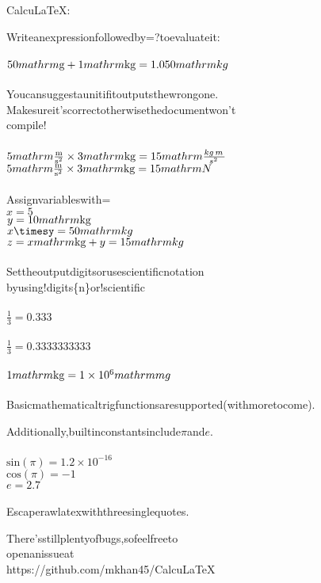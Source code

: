 \documentclass{article}
\begin{document}
CalcuLaTeX:

Writeanexpressionfollowedby=?toevaluateit:
\\\\$50\\mathrm{\mathrm{g}}+1\\mathrm{\mathrm{kg}}=1.050\\mathrm{kg\,}$\\
\\
Youcansuggestaunitifitoutputsthewrongone.\\
Makesureit'scorrectotherwisethedocumentwon't\\
compile!
\\\\$5\\mathrm{\mathrm{\frac{\mathrm{m}}{\mathrm{\mathrm{s}^{2}}}}}\times3\\mathrm{\mathrm{kg}}=15\\mathrm{\frac{kg\,m\,}{s^{2}\,}}$\\
$5\\mathrm{\mathrm{\frac{\mathrm{m}}{\mathrm{\mathrm{s}^{2}}}}}\times3\\mathrm{\mathrm{kg}}=15\\mathrm{N}$\\
\\
Assignvariableswith=
\\$x=5$\\
$y=10\\mathrm{\mathrm{kg}}$\\
$x\timesy=50\\mathrm{kg\,}$\\
$z=x\\mathrm{\mathrm{kg}}+y=15\\mathrm{kg\,}$\\
\\
Settheoutputdigitsorusescientificnotation\\
byusing!digits\{n\}or!scientific
\\\\$\frac{1}{3}=0.333$\\
\\$\frac{1}{3}=0.3333333333$\\
\\$1\\mathrm{\mathrm{kg}}=1\times10^{6}\\mathrm{mg}$\\
\\
Basicmathematicaltrigfunctionsaresupported(withmoretocome).

Additionally,builtinconstantsinclude$\pi$and$e$.
\\\\$\text{sin}(\pi)=1.2\times10^{-16}$\\
$\text{cos}(\pi)=-1$\\
$e=2.7$\\
\\
Escaperawlatexwiththreesinglequotes.

There'sstillplentyofbugs,sofeelfreeto\\
openanissueat\\
https://github.com/mkhan45/CalcuLaTeX
\\
\end{document}
